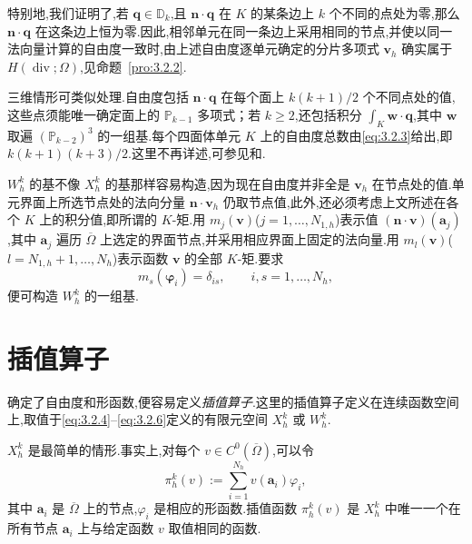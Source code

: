特别地,我们证明了,若 \(\boldsymbol{q}\in\mathbb D_k\),且 \(\boldsymbol{n}\cdot\boldsymbol{q}\) 在 \(K\) 的某条边上 \(k\) 个不同的点处为零,那么 \(\boldsymbol{n}\cdot\boldsymbol{q}\) 在这条边上恒为零.因此,相邻单元在同一条边上采用相同的节点,并使以同一法向量计算的自由度一致时,由上述自由度逐单元确定的分片多项式 \(\boldsymbol{v}_h\) 确实属于 \(H(\operatorname{div};\Omega)\),见命题~\ref{pro:3.2.2}.

三维情形可类似处理.自由度包括 \(\boldsymbol{n}\cdot\boldsymbol{q}\) 在每个面上 \(k(k+1)/2\) 个不同点处的值,这些点须能唯一确定面上的 \(\mathbb P_{k-1}\) 多项式；若 \(k\ge2\),还包括积分 \(\int_K\boldsymbol{w}\cdot\boldsymbol{q}\),其中 \(\boldsymbol{w}\) 取遍 \((\mathbb P_{k-2})^3\) 的一组基.每个四面体单元 \(K\) 上的自由度总数由\eqref{eq:3.2.3}给出,即 \(k(k+1)(k+3)/2\).这里不再详述,可参见和.

\(W_h^k\) 的基不像 \(X_h^k\) 的基那样容易构造,因为现在自由度并非全是 \(\boldsymbol{v}_h\) 在节点处的值.单元界面上所选节点处的法向分量 \(\boldsymbol{n}\cdot\boldsymbol{v}_h\) 仍取节点值,此外,还必须考虑上文所述在各个 \(K\) 上的积分值,即所谓的 \(K\)-矩.用 \(m_j(\boldsymbol{v})\)(\(j=1,\ldots,N_{1,h}\))表示值 \((\boldsymbol{n}\cdot\boldsymbol{v})(\boldsymbol{a}_j)\),其中 \(\boldsymbol{a}_j\) 遍历 \(\overline\Omega\) 上选定的界面节点,并采用相应界面上固定的法向量.用 \(m_l(\boldsymbol{v})\)(\(l=N_{1,h}+1,\ldots,N_h\))表示函数 \(\boldsymbol{v}\) 的全部 \(K\)-矩.要求
\begin{equation}\label{eq:3.3.4}
  m_s(\boldsymbol{\varphi}_i)=\delta_{is},\qquad i,s=1,\ldots,N_h,
\end{equation}
便可构造 \(W_h^k\) 的一组基.

\section{插值算子}\label{sec:3.4}

确定了自由度和形函数,便容易定义\emph{插值算子}.这里的插值算子定义在连续函数空间上,取值于\eqref{eq:3.2.4}–\eqref{eq:3.2.6}定义的有限元空间 \(X_h^k\) 或 \(W_h^k\).

\(X_h^k\) 是最简单的情形.事实上,对每个 \(v\in C^0(\overline\Omega)\),可以令
\begin{equation}\label{eq:3.4.1}
  \pi_h^k(v):=\sum_{i=1}^{N_h}v(\boldsymbol{a}_i)\varphi_i,
\end{equation}
其中 \(\boldsymbol{a}_i\) 是 \(\overline\Omega\) 上的节点,\(\varphi_i\) 是相应的形函数.插值函数 \(\pi_h^k(v)\) 是 \(X_h^k\) 中唯一一个在所有节点 \(\boldsymbol{a}_i\) 上与给定函数 \(v\) 取值相同的函数.


